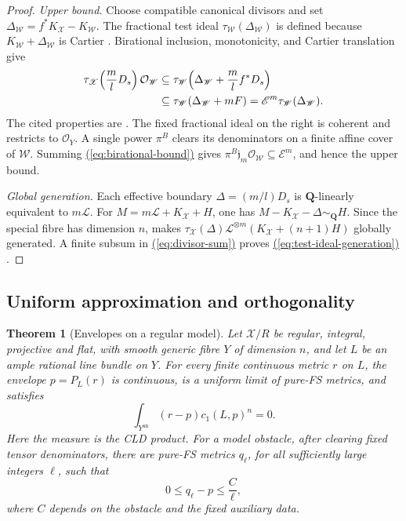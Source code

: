 \documentclass[11pt]{amsart}
\newtheorem{theorem}{Theorem}[section]
\theoremstyle{definition}
\theoremstyle{remark}
\numberwithin{equation}{section}
\newcommand{\an}{\mathrm{an}}
\newcommand{\OO}{\mathcal O}
\newcommand{\cX}{\mathscr X}
\newcommand{\cW}{\mathscr W}
\newcommand{\cL}{\mathscr L}
\newcommand{\cE}{\mathscr E}
\renewcommand{\eqref}[1]{%
 \begingroup\hypersetup{linkcolor=equationviolet}%
 \hyperref[#1]{\textup{(\ref*{#1})}}%
 \endgroup}
\begin{document}
\begin{proof}
\smallskip\noindent
\emph{Upper bound.}
Choose compatible canonical divisors and set
\(\Delta_{\cW}=f^*K_{\cX}-K_{\cW}\).
The fractional test ideal \(\tau_{\cW}(\Delta_{\cW})\) is defined because
\(K_{\cW}+\Delta_{\cW}\) is Cartier
\cite[Definition~7.20]{BMP}.
Birational inclusion, monotonicity, and Cartier translation give
\begin{align}
 \tau_{\cX}\!\left(\frac mlD_s\right)\OO_{\cW}
 &\subseteq
 \tau_{\cW}\!\left(\Delta_{\cW}+\frac ml f^*D_s\right) \notag\\
 &\subseteq
 \tau_{\cW}(\Delta_{\cW}+mF)
 =\cE^m\tau_{\cW}(\Delta_{\cW}).
 \label{eq:birational-bound}
\end{align}
The cited properties are
\cite[Proposition~7.16(a),(b) and Theorem~7.22(d)]{BMP}.
The fixed fractional ideal on the right is coherent and restricts to
\(\OO_Y\). A single power \(\pi^B\) clears its denominators on a finite
affine cover of \(\cW\). Summing \eqref{eq:birational-bound} gives
\(\pi^B\mathfrak j_m\OO_{\cW}\subseteq\cE^m\), and hence the upper bound.

\smallskip\noindent
\emph{Global generation.}
Each effective boundary \(\Delta=(m/l)D_s\) is
\(\mathbf Q\)-linearly equivalent to \(m\cL\).
For \(M=m\cL+K_{\cX}+H\), one has
\(M-K_{\cX}-\Delta\sim_{\mathbf Q}H\).
Since the special fibre has dimension \(n\),
\cite[Corollary~7.24]{BMP} makes
\(\tau_{\cX}(\Delta)\cL^{\otimes m}(K_{\cX}+(n+1)H)\)
globally generated. A finite subsum in \eqref{eq:divisor-sum}
proves \eqref{eq:test-ideal-generation}.
\end{proof}

\subsection{Uniform approximation and orthogonality}\label{subsec:envelope-proof}

\begin{theorem}[Envelopes on a regular model]\label{thm:envelope}
Let \(\cX/R\) be regular, integral, projective and flat, with smooth generic
fibre \(Y\) of dimension \(n\), and let \(L\) be an ample rational line
bundle on \(Y\).
For every finite continuous metric \(r\) on \(L\), the envelope
\(p=P_L(r)\) is continuous, is a uniform limit of pure-FS metrics, and
satisfies
\begin{equation}\label{eq:regular-model-orthogonality}
 \int_{Y^{\an}}(r-p)c_1(L,p)^n=0.
\end{equation}
Here the measure is the CLD product.
For a model obstacle, after clearing fixed tensor denominators,
there are pure-FS metrics \(q_\ell\), for all sufficiently large
integers \(\ell\), such that
\begin{equation}\label{eq:regular-model-approximation}
 0\le q_\ell-p\le \frac C\ell,
\end{equation}
where \(C\) depends on the obstacle and the fixed auxiliary data.
\end{theorem}
\end{document}
